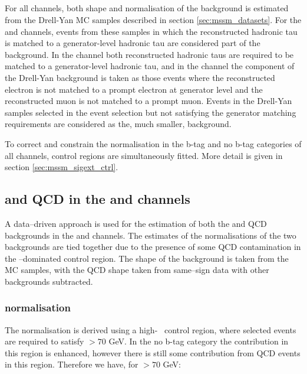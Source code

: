 \subsection{\texorpdfstring{\Ztautau}{Z to tau tau}}
\label{sec:mssm_bkgs_ztt}
For all channels, both shape and normalisation of the \Ztautau background 
is estimated from the Drell-Yan
\ac{MC} samples described in section \ref{sec:mssm_datasets}.
For the \mutau and \etau channels, events from these samples 
in which the reconstructed hadronic tau is matched to 
a generator-level hadronic tau are considered part of the \Ztautau
background. In the \tautau channel both reconstructed
hadronic taus are required to be matched to a generator-level hadronic tau, and
in the \emu channel the \Ztautau component of the Drell-Yan background 
is taken as those events where the reconstructed electron is not matched to
a prompt electron at generator level and the reconstructed
muon is not matched to a prompt muon. 
Events in the Drell-Yan samples selected in the event selection
but not satisfying the generator matching requirements are considered
as the, much smaller, \Zll background.

To correct and constrain the \Ztautau normalisation in the
b-tag and no b-tag categories of all channels, \Zmm control
regions are simultaneously fitted. More detail is given in 
section \ref{sec:mssm_sigext_ctrl}.

\subsection{\texorpdfstring{\Wjets and QCD in the \etau and \mutau channels}{W+jets and QCD in the e tau and mu tau channels}}
\label{sec:mssm_bkgs_mtet_wjetsqcd}
A data--driven approach is used for the estimation of
both the \Wjets and QCD backgrounds in the \etau and \mutau channels. 
The estimates of the normalisations of the two backgrounds are tied
together due to the presence of some QCD contamination in the \Wjets--dominated
control region. The shape of the \Wjets background is taken
from the \ac{MC} samples, with the QCD shape taken from same--sign
data with other backgrounds subtracted.

\subsubsection{\texorpdfstring{\Wjets normalisation}{W+jets normalisation}}
\label{sec:mssm_bkgs_mtet_wjetsnorm}
The \Wjets normalisation is derived using a high-\mT~ control region, where
selected events are required to satisfy \mT$>70$ GeV. In the no b-tag
category the \Wjets
contribution in this region is enhanced, however there is still
some contribution from QCD events in this region. Therefore we
have, for \mT$>70$ GeV:

